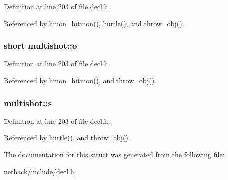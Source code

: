 Definition at line 203 of file decl.\+h.



Referenced by hmon\+\_\+hitmon(), hurtle(), and throw\+\_\+obj().

\hypertarget{structmultishot_addd43be0e56011781a690bb29031f58e}{
\subsubsection[{o}]{\setlength{\rightskip}{0pt plus 5cm}short multishot\+::o}}\label{structmultishot_addd43be0e56011781a690bb29031f58e}


Definition at line 203 of file decl.\+h.



Referenced by hmon\+\_\+hitmon(), and throw\+\_\+obj().

\hypertarget{structmultishot_acc85ac2a091e5aec36d1b5d308775ffe}{
\subsubsection[{s}]{ multishot\+::s}}\label{structmultishot_acc85ac2a091e5aec36d1b5d308775ffe}


Definition at line 203 of file decl.\+h.



Referenced by hurtle(), and throw\+\_\+obj().



The documentation for this struct was generated from the following file\+:\begin{DoxyCompactItemize}
\item 
nethack/include/\hyperlink{decl_8h}{decl.\+h}\end{DoxyCompactItemize}
